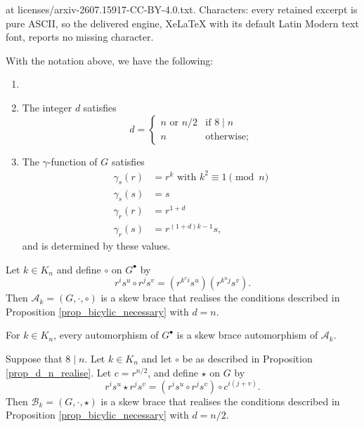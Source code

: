 \documentclass[10pt,a4paper]{amsart}
\begin{document}
at licenses/arxiv-2607.15917-CC-BY-4.0.txt. Characters: every retained excerpt is pure ASCII, so the delivered engine, XeLaTeX with its default Latin Modern text font, reports no missing character.
\begin{proposition} \label{prop_bicylic_necessary} 
With the notation above, we have the following:
\begin{enumerate}
\item[]
\item The integer $ d $ satisfies
\[ d= \begin{cases} 
n \mbox{ or } n/2 & \mbox{if } 8 \mid n \\
n & \mbox{otherwise;} \end{cases} \]
\item The $ \gamma $-function of $ G $ satisfies
\begin{align*}
\gamma_{s}(r) &= r^{k} \mbox{ with } k^{2} \equiv 1 \pmod{n} \\
\gamma_{s}(s) &= s \\
\gamma_{r}(r) &= r^{1+d} \\
\gamma_{r}(s) &= r^{(1+d)k-1}s,
\end{align*}
and is determined by these values. 
\end{enumerate}
\end{proposition}

\begin{proposition} \label{prop_d_n_realise}
Let $ k \in K_{n} $ and define $ \circ $ on $ G^{\bullet} $ by
\[ r^{i}s^{u} \circ r^{j}s^{v} = \left( r^{k^{v}i}s^{u} \right)\left( r^{k^{u}j}s^{v} \right). \]
Then $ \mathscr{A}_{k} = (G,\cdot,\circ) $ is a skew brace that realises the conditions described in Proposition \ref{prop_bicylic_necessary} with $ d=n $. 
\end{proposition}

\begin{proposition} \label{prop_d_n_isomorphism}
For $ k \in K_{n} $, every automorphism of $ G^{\bullet} $ is a skew brace automorphism of $ \mathscr{A}_{k} $. 
\end{proposition}

\begin{proposition} \label{prop_d_n_2_realise}
Suppose that $ 8 \mid n $. Let $ k \in K_{n} $ and let $ \circ $ be as described in Proposition \ref{prop_d_n_realise}. Let $ c=r^{n/2} $, and define $ \star $ on $ G $ by
\[ r^{i}s^{u} \star r^{j}s^{v} = \left( r^{i}s^{u} \circ r^{j}s^{v} \right) \circ c^{i(j+v)}. \]
Then $ \mathscr{B}_{k} = (G,\cdot,\star) $ is a skew brace that realises the conditions described in Proposition \ref{prop_bicylic_necessary} with $ d=n/2 $. 
\end{proposition}
\end{document}
